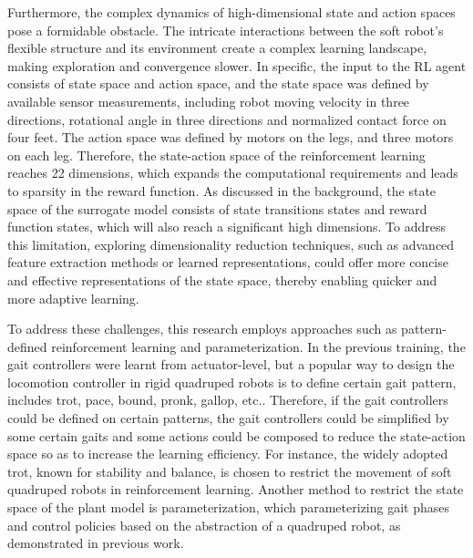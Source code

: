 Furthermore, the complex dynamics of high-dimensional state and action spaces pose a formidable obstacle. The intricate interactions between the soft robot's flexible structure and its environment create a complex learning landscape\cite{arulkumaranDeepReinforcementLearning2017}, making exploration and convergence slower. In specific, the input to the \ac{RL} agent consists of state space and action space, and the state space was defined by available sensor measurements, including robot moving velocity in three directions, rotational angle in three directions and normalized contact force on four feet. The action space was defined by motors on the legs, and three motors on each leg. Therefore, the state-action space of the reinforcement learning reaches 22 dimensions, which expands the computational requirements and leads to sparsity in the reward function. As discussed in the background, the state space of the surrogate model consists of state transitions states and reward function states, which will also reach a significant high dimensions. To address this limitation, exploring dimensionality reduction techniques, such as advanced feature extraction methods\cite{polydorosSurveyModelBasedReinforcement2017} or learned representations\cite{wangBenchmarkingModelBasedReinforcement2019}, could offer more concise and effective representations of the state space, thereby enabling quicker and more adaptive learning. 

To address these challenges, this research employs approaches such as pattern-defined reinforcement learning and parameterization. In the previous training\cite{jiSynthesizingOptimalGait2022}, the gait controllers were learnt from actuator-level, but a popular way to design the locomotion controller in rigid quadruped robots is to define certain gait pattern, includes trot, pace, bound, pronk, gallop, etc.\cite{zhongAnalysisResearchQuadruped2019}. Therefore, if the gait controllers could be defined on certain patterns, the gait controllers could be simplified by some certain gaits and some actions could be composed to reduce the state-action space so as to increase the learning efficiency\cite{owakiQuadrupedRobotExhibiting2017}. For instance, the widely adopted trot, known for stability and balance\cite{fletcherTrot2012}, is chosen to restrict the movement of soft quadruped robots in reinforcement learning. Another method to restrict the state space of the plant model is parameterization, which parameterizing gait phases and control policies based on the abstraction of a quadruped robot\cite{shaoLearningFreeGait2022}, as demonstrated in previous work\cite{jiOmnidirectionalWalkingQuadruped2022}.

